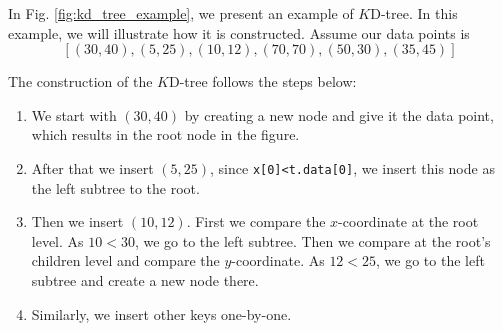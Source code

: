 \begin{mscexample}
	In Fig. \ref{fig:kd_tree_example}, we present an example of $K$D-tree. In this example, we will illustrate how it is constructed. Assume our data points is $$[(30,40), (5,25), (10,12), (70,70), (50,30), (35,45)]$$
	
	The construction of the $K$D-tree follows the steps below:
	
	\begin{enumerate}
		\item We start with $(30,40)$ by creating a new node and give it the data point, which results in the root node in the figure.
		\item After that we insert $(5,25)$, since \texttt{x[0]<t.data[0]}, we insert this node as the left subtree to the root.
		\item Then we insert $(10, 12)$. First we compare the $x$-coordinate at the root level. As $10<30$, we go to the left subtree. Then we compare at the root's children level and compare the $y$-coordinate. As $12<25$, we go to the left subtree and create a new node there.
		\item Similarly, we insert other keys one-by-one.
	\end{enumerate}
	
	
	
	
	
	 
\end{mscexample}